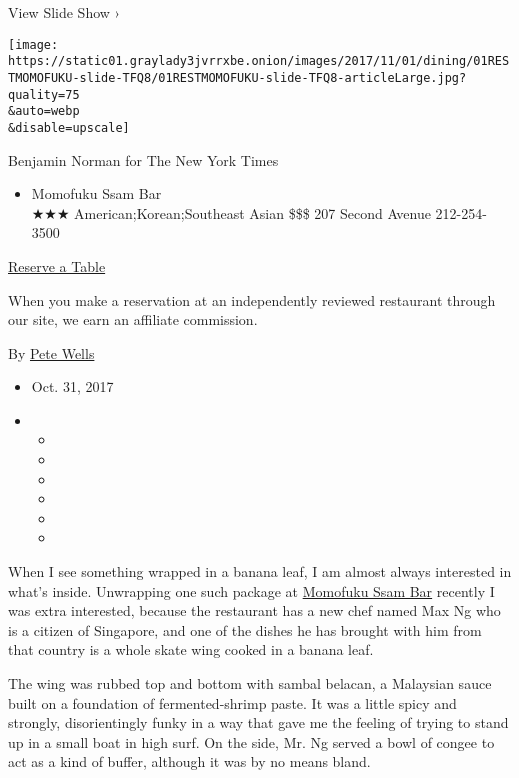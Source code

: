 View Slide Show ›

\texttt{[image: https://static01.graylady3jvrrxbe.onion/images/2017/11/01/dining/01RESTMOMOFUKU-slide-TFQ8/01RESTMOMOFUKU-slide-TFQ8-articleLarge.jpg?quality=75\\\&auto=webp\\\&disable=upscale]}

Benjamin Norman for The New York Times

\begin{itemize}
\tightlist
\item
  Momofuku Ssam Bar\\
  ★★★ American;Korean;Southeast Asian \$\$\$ 207 Second Avenue
  212-254-3500
\end{itemize}

\href{https://www.opentable.com/single.aspx?ref=4201\&rid=275446}{Reserve
a Table}

When you make a reservation at an independently reviewed restaurant
through our site, we earn an affiliate commission.

By \href{http://www.nytimes3xbfgragh.onion/by/pete-wells}{Pete Wells}

\begin{itemize}
\item
  Oct. 31, 2017
\item
  \begin{itemize}
  \item
  \item
  \item
  \item
  \item
  \item
  \end{itemize}
\end{itemize}

When I see something wrapped in a banana leaf, I am almost always
interested in what's inside. Unwrapping one such package at
\href{https://ssambar.momofuku.com/}{Momofuku Ssam Bar} recently I was
extra interested, because the restaurant has a new chef named Max Ng who
is a citizen of Singapore, and one of the dishes he has brought with him
from that country is a whole skate wing cooked in a banana leaf.

The wing was rubbed top and bottom with sambal belacan, a Malaysian
sauce built on a foundation of fermented-shrimp paste. It was a little
spicy and strongly, disorientingly funky in a way that gave me the
feeling of trying to stand up in a small boat in high surf. On the side,
Mr. Ng served a bowl of congee to act as a kind of buffer, although it
was by no means bland.

